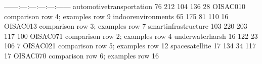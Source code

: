 {}\markdownRendererPipe{}---\markdownRendererPipe{}---:\markdownRendererPipe{}---:\markdownRendererPipe{}---:\markdownRendererPipe{}---:\markdownRendererPipe{}---:\markdownRendererPipe{}---\markdownRendererPipe{}---\markdownRendererPipe{}\markdownRendererSoftLineBreak
{}\markdownRendererPipe{} automotive\markdownRendererUnderscore{}transportation \markdownRendererPipe{} 76 \markdownRendererPipe{} 212 \markdownRendererPipe{} 104 \markdownRendererPipe{} 136 \markdownRendererPipe{} 28 \markdownRendererPipe{} O\markdownRendererUnderscore{}ISAC\markdownRendererUnderscore{}010 \markdownRendererPipe{} comparison row \markdownRendererHash{}4; examples row \markdownRendererHash{}9 \markdownRendererPipe{}\markdownRendererSoftLineBreak
{}\markdownRendererPipe{} indoor\markdownRendererUnderscore{}environments \markdownRendererPipe{} 65 \markdownRendererPipe{} 175 \markdownRendererPipe{} 81 \markdownRendererPipe{} 110 \markdownRendererPipe{} 16 \markdownRendererPipe{} O\markdownRendererUnderscore{}ISAC\markdownRendererUnderscore{}013 \markdownRendererPipe{} comparison row \markdownRendererHash{}3; examples row \markdownRendererHash{}7 \markdownRendererPipe{}\markdownRendererSoftLineBreak
{}\markdownRendererPipe{} smart\markdownRendererUnderscore{}infrastructure \markdownRendererPipe{} 103 \markdownRendererPipe{} 220 \markdownRendererPipe{} 203 \markdownRendererPipe{} 117 \markdownRendererPipe{} 100 \markdownRendererPipe{} O\markdownRendererUnderscore{}ISAC\markdownRendererUnderscore{}071 \markdownRendererPipe{} comparison row \markdownRendererHash{}2; examples row \markdownRendererHash{}4 \markdownRendererPipe{}\markdownRendererSoftLineBreak
{}\markdownRendererPipe{} underwater\markdownRendererUnderscore{}harsh \markdownRendererPipe{} 16 \markdownRendererPipe{} 122 \markdownRendererPipe{} 23 \markdownRendererPipe{} 106 \markdownRendererPipe{} 7 \markdownRendererPipe{} O\markdownRendererUnderscore{}ISAC\markdownRendererUnderscore{}021 \markdownRendererPipe{} comparison row \markdownRendererHash{}5; examples row \markdownRendererHash{}12 \markdownRendererPipe{}\markdownRendererSoftLineBreak
{}\markdownRendererPipe{} space\markdownRendererUnderscore{}satellite \markdownRendererPipe{} 17 \markdownRendererPipe{} 134 \markdownRendererPipe{} 34 \markdownRendererPipe{} 117 \markdownRendererPipe{} 17 \markdownRendererPipe{} O\markdownRendererUnderscore{}ISAC\markdownRendererUnderscore{}070 \markdownRendererPipe{} comparison row \markdownRendererHash{}6; examples row \markdownRendererHash{}16 \markdownRendererPipe{}\markdownRendererParagraphSeparator
{}\markdownRendererSectionBegin
